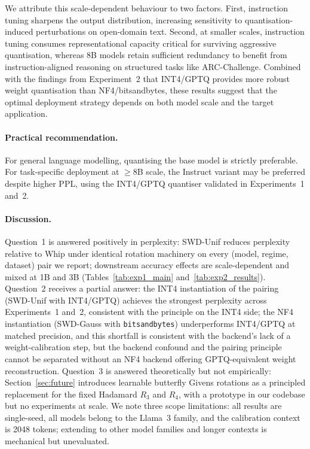 \documentclass[11pt,a4paper]{article}
\begin{document}
We attribute this scale-dependent behaviour to two factors. First, instruction tuning sharpens the output distribution, increasing sensitivity to quantisation-induced perturbations on open-domain text. Second, at smaller scales, instruction tuning consumes representational capacity critical for surviving aggressive quantisation, whereas 8B models retain sufficient redundancy to benefit from instruction-aligned reasoning on structured tasks like ARC-Challenge. Combined with the findings from Experiment~2 that INT4/GPTQ provides more robust weight quantisation than NF4/bitsandbytes, these results suggest that the optimal deployment strategy depends on both model scale and the target application.
 
\paragraph{Practical recommendation.} For general language modelling, quantising the base model is strictly preferable. For task-specific deployment at $\geq$8B scale, the Instruct variant may be preferred despite higher PPL, using the INT4/GPTQ quantiser validated in Experiments~1 and~2.

\paragraph{Discussion.} Question~1 is answered positively in perplexity: SWD-Unif reduces perplexity relative to Whip under identical rotation machinery on every (model, regime, dataset) pair we report; downstream accuracy effects are scale-dependent and mixed at 1B and 3B (Tables~\ref{tab:exp1_main} and~\ref{tab:exp2_results}). Question~2 receives a partial answer: the INT4 instantiation of the pairing (SWD-Unif with INT4/GPTQ) achieves the strongest perplexity across Experiments~1 and~2, consistent with the principle on the INT4 side; the NF4 instantiation (SWD-Gauss with \texttt{bitsandbytes}) underperforms INT4/GPTQ at matched precision, and this shortfall is consistent with the backend's lack of a weight-calibration step, but the backend confound and the pairing principle cannot be separated without an NF4 backend offering GPTQ-equivalent weight reconstruction. Question~3 is answered theoretically but not empirically: Section~\ref{sec:future} introduces learnable butterfly Givens rotations as a principled replacement for the fixed Hadamard $R_3$ and $R_4$, with a prototype in our codebase but no experiments at scale. We note three scope limitations: all results are single-seed, all models belong to the Llama~3 family, and the calibration context is 2048 tokens; extending to other model families and longer contexts is mechanical but unevaluated.
\end{document}
